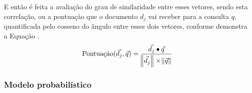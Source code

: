     
    
    E então é feita a avaliação do grau de similaridade entre esses vetores, sendo esta correlação, ou a pontuação que o documento $d_j$ vai receber para a consulta $q$, quantificada pelo cosseno do ângulo entre esses dois vetores, conforme demonstra a Equação .
    \begin{equation}
    			\text{Pontuação}(\vec{d_j}, \vec{q}) = \frac{\vec{d_j} \bullet \vec{q} }{ \norm{\vec{d_j}} \times \norm{\vec{q}} }
    \end{equation}




\subsubsection{Modelo probabilístico}  \label{subsubsec:Modelo-probabilístico}
        
    

